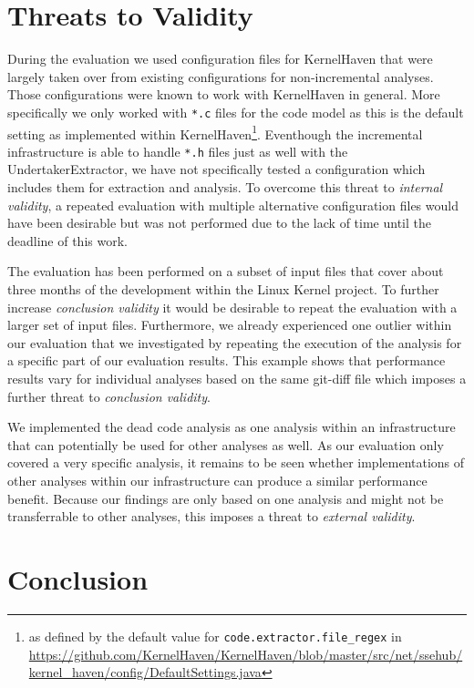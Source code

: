 \documentclass[a4paper]{article}
\begin{document}
\clearpage
\newpage

\section{Threats to Validity}\label{threats-to-validity}

During the evaluation we used configuration files for KernelHaven that were largely taken over from existing configurations for non-incremental analyses. Those configurations were known to work with KernelHaven in general. More specifically we only worked with \texttt{*.c} files for the code model as this is the default setting as implemented within KernelHaven\footnote{as defined by the default value for \texttt{code.extractor.file\_regex} in \url{https://github.com/KernelHaven/KernelHaven/blob/master/src/net/ssehub/kernel_haven/config/DefaultSettings.java}}. Eventhough the incremental infrastructure is able to handle \texttt{*.h} files just as well with the UndertakerExtractor, we have not specifically tested a configuration which includes them for extraction and analysis. To overcome this threat to \emph{internal validity}, a repeated evaluation with multiple alternative configuration files would have been desirable but was not performed due to the lack of time until the deadline of this work.

The evaluation has been performed on a subset of input files that cover about three months of the development within the Linux Kernel project. To further increase  \emph{conclusion validity} it would be desirable to repeat the evaluation with a larger set of input files. Furthermore, we already experienced one outlier within our evaluation that we investigated by repeating the execution of the analysis for a specific part of our evaluation results. This example shows that  performance results vary for individual analyses based on the same git-diff file which imposes a further threat to \emph{conclusion validity}.

We implemented the dead code analysis as one analysis within an infrastructure that can potentially be used for other analyses as well. As our evaluation only covered a very specific analysis, it remains to be seen whether implementations of other analyses within our infrastructure can produce a similar performance benefit. Because our findings are only based on one analysis and might not be transferrable to other analyses, this imposes a threat to \emph{external validity}.


\clearpage
\newpage
\section{Conclusion}\label{conclusion}
\end{document}

